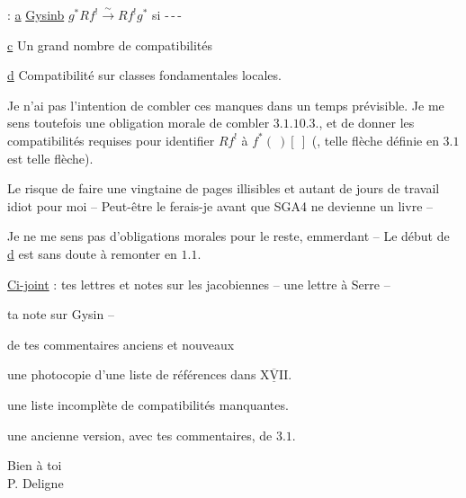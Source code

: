 

 : \uline{a} \uline{Gysin}\qquad \uline{b} $g^*Rf^!\xrightarrow{\sim}Rf^!g^*$ si \mbox{-\,-\,-}

\uline{c} Un grand nombre de compatibilités 

\uline{d} Compatibilité sur classes fondamentales locales.

Je n'ai pas l'intention de combler ces manques dans un
temps prévisible. Je me sens toutefois une obligation morale
\margin{$\left[\vphantom{\rule{0pt}{5\baselineskip}}\right.$}de combler $3.1.10.3$., et de donner les compatibilités requises
pour identifier $Rf^!$ à $f^*(\ )[\ ]$ (, telle flèche définie en $3.1$ est telle flèche).

Le risque de faire une vingtaine de pages illisibles et autant de
jours de travail idiot pour moi -- Peut-être le ferais-je avant
que SGA4 ne devienne un livre --

Je ne me sens pas d'obligations morales pour le reste, 
emmerdant -- Le début de \uline{d} est sans doute à remonter en $1.1$.

\uline{Ci-joint} : tes lettres et notes sur les jacobiennes -- une lettre à Serre --

ta note sur Gysin --

de tes commentaires anciens et nouveaux

une photocopie d'une liste de références dans $\underline{\overline{\mathrm{XVII}}}$.

une liste incomplète de compatibilités manquantes.

une ancienne version, avec tes commentaires, de $3.1$.

Bien à toi\\
P. Deligne\\

